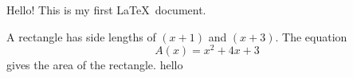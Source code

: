 \documentclass[11pt]{article}
\begin{document}
Hello! This is my first \LaTeX\ document.

A rectangle has side lengths of $(x+1)$ and $(x+3)$. The equation $${A(x)=x^2+4x+3}$$ gives the area of the rectangle.
hello 
\end{document}
